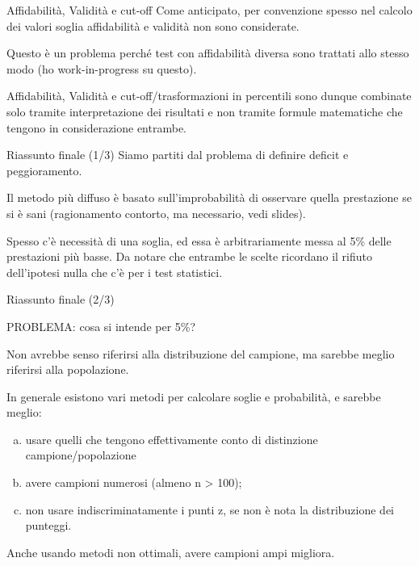 \documentclass[
  ignorenonframetext,
  aspectratio=169,
]{beamer}
\begin{document}
\begin{frame}{Affidabilità, Validità e cut-off}
\label{affidabilituxe0-validituxe0-e-cut-off}
Come anticipato, per convenzione spesso nel calcolo dei valori soglia
affidabilità e validità non sono considerate. \pause

Questo è un problema perché test con affidabilità diversa sono trattati
allo stesso modo (ho work-in-progress su questo).

Affidabilità, Validità e cut-off/trasformazioni in percentili sono
dunque combinate solo tramite interpretazione dei risultati e non
tramite formule matematiche che tengono in considerazione entrambe.
\end{frame}

\begin{frame}{Riassunto finale (1/3)}
\label{riassunto-finale-13}
Siamo partiti dal problema di definire deficit e peggioramento.

Il metodo più diffuso è basato sull'improbabilità di osservare quella
prestazione se si è sani (ragionamento contorto, ma necessario, vedi
slides).

Spesso c'è necessità di una soglia, ed essa è arbitrariamente messa al
5\% delle prestazioni più basse. Da notare che entrambe le scelte
ricordano il rifiuto dell'ipotesi nulla che c'è per i test statistici.
\end{frame}

\begin{frame}{Riassunto finale (2/3)}
\label{riassunto-finale-23}
\begin{center}
PROBLEMA: cosa si intende per 5\%? 
\end{center}

Non avrebbe senso riferirsi alla distribuzione del campione, ma sarebbe
meglio riferirsi alla popolazione.

In generale esistono vari metodi per calcolare soglie e probabilità, e
sarebbe meglio:

\begin{enumerate}
[a)]
\item
  usare quelli che tengono effettivamente conto di distinzione
  campione/popolazione
\item
  avere campioni numerosi (almeno n \textgreater{} 100);
\item
  non usare indiscriminatamente i punti z, se non è nota la
  distribuzione dei punteggi.
\end{enumerate}

Anche usando metodi non ottimali, avere campioni ampi migliora.
\end{frame}
\end{document}
